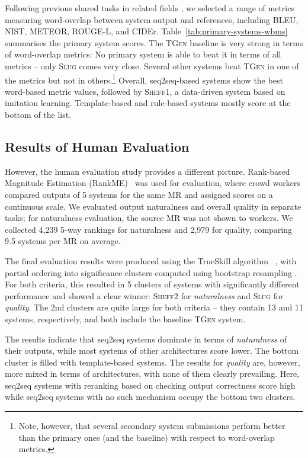 \documentclass[11pt,a4paper]{article}
\newcommand\tgen{\textsc{TGen}\xspace}
\newcommand\slug{\textsc{Slug}\xspace}
\newcommand\sheffi{\textsc{Sheff1}\xspace}
\newcommand\sheffii{\textsc{Sheff2}\xspace}
\begin{document}
Following previous shared tasks in related fields \cite{bojar_results_2017,chen_microsoft_2015}, we selected a range of 
metrics measuring word-overlap between system output and references, including BLEU, NIST, METEOR, ROUGE-L, and CIDEr.
Table~\ref{tab:primary-systems-wbms} summarises the primary system scores. The \tgen baseline is very strong in terms of word-overlap metrics: No primary system is able to beat it in terms of all metrics -- only \slug comes very close. Several other systems beat \tgen in one of the metrics but not in others.\footnote{Note, however, that several secondary system submissions perform better than the primary ones (and the baseline) with respect to word-overlap metrics. }
Overall, seq2seq-based systems show the best word-based metric values, followed by \sheffi, a data-driven system based on imitation learning. Template-based and rule-based systems mostly score at the bottom of the list.  




\subsection{Results of Human Evaluation}
\label{sec:results-human}


However, the human evaluation study provides a different picture.
Rank-based Magnitude Estimation (RankME)~\cite{novikova:2018} was used for evaluation, where crowd workers compared outputs of 5 systems for the same MR and assigned scores on a continuous scale.
We evaluated output naturalness and overall quality in separate tasks; for naturalness evaluation, the source MR was not shown to workers.
We collected 4,239 5-way rankings for naturalness and 2,979 for quality, comparing 9.5 systems per MR on average.

The final evaluation results were produced using the TrueSkill algorithm ~\cite{herbrich2007trueskill, sakaguchi2014efficient}, with partial ordering into significance clusters computed using bootstrap resampling \cite{bojar_findings_2013,bojar_findings_2014,sakaguchi2014efficient}. 
For both criteria, this resulted in 5 clusters of systems with significantly different performance and showed 
a clear winner: \sheffii for {\em naturalness} and \slug for {\em quality}. 
The 2nd clusters are quite large for both criteria -- they contain 13 and 11 systems, respectively, and both include the baseline \tgen system.


The results indicate that seq2seq systems dominate in terms of {\em naturalness} of their outputs, while most systems of other architectures score lower. The bottom cluster is filled with template-based systems. The results for {\em quality} are, however, more mixed in terms of architectures, with none of them clearly prevailing. Here, seq2seq systems with reranking based on checking output correctness score high while seq2seq systems with no such mechanism occupy the bottom two clusters.
\end{document}
